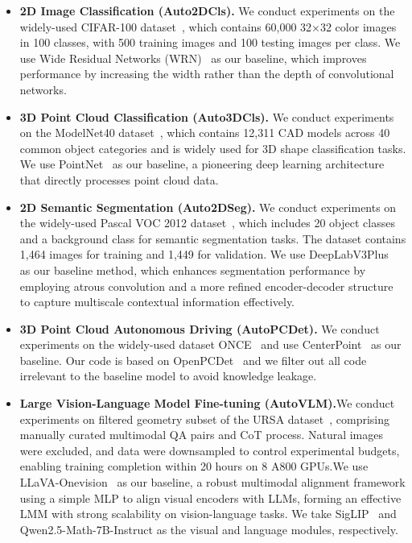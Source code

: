 \begin{itemize}
    \item \textbf{2D Image Classification (Auto2DCls).} We conduct experiments on the widely-used CIFAR-100 dataset~\citep{krizhevsky2009cifar}, which contains 60,000 32×32 color images in 100 classes, with 500 training images and 100 testing images per class. We use Wide Residual Networks (WRN)~\citep{zagoruyko2016wrn} as our baseline, which improves performance by increasing the width rather than the depth of convolutional networks.
    \item \textbf{3D Point Cloud Classification (Auto3DCls).} We conduct experiments on the ModelNet40 dataset~\citep{wu2015modelnet}, which contains 12,311 CAD models across 40 common object categories and is widely used for 3D shape classification tasks. We use PointNet~\citep{qi2017pointnet} as our baseline, a pioneering deep learning architecture that directly processes point cloud data.
    \item \textbf{2D Semantic Segmentation (Auto2DSeg).} We conduct experiments on the widely-used Pascal VOC 2012 dataset~\citep{pascal-voc-2012}, which includes 20 object classes and a background class for semantic segmentation tasks. The dataset contains 1,464 images for training and 1,449 for validation. We use DeepLabV3Plus~\citep{chen2018encoder} as our baseline method, which enhances segmentation performance by employing atrous convolution and a more refined encoder-decoder structure to capture multiscale contextual information effectively.
    \item \textbf{3D Point Cloud Autonomous Driving (AutoPCDet).} We conduct experiments on the widely-used dataset ONCE~\citep{mao2021once} and use CenterPoint~\citep{yin2021center} as our baseline. Our code is based on OpenPCDet~\citep{openpcdet2020} and we filter out all code irrelevant to the baseline model to avoid knowledge leakage.
\item \textbf{Large Vision-Language Model Fine-tuning (AutoVLM).}We conduct experiments on filtered geometry subset of the URSA dataset~\citep{luo2025ursa}, comprising manually curated multimodal QA pairs and CoT process. Natural images were excluded, and data were downsampled to control experimental budgets, enabling training completion within 20 hours on 8 A800 GPUs.We use LLaVA-Onevision~\citep{li2024llava} as our baseline, a robust multimodal alignment framework using a simple MLP to align visual encoders with LLMs, forming an effective LMM with strong scalability on vision-language tasks. We take SigLIP~\citep{zhai2023sigmoid} and Qwen2.5-Math-7B-Instruct\citep{yang2409qwen2} as the visual and language modules, respectively.
\end{itemize}


